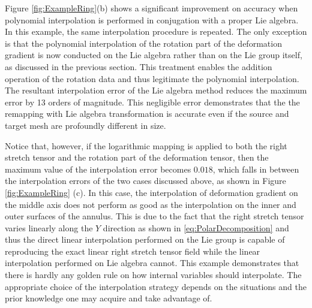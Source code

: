 \documentclass[12pt]{article}
\begin{document}
Figure \ref{fig:ExampleRing}(b) shows a significant improvement on
accuracy when polynomial interpolation is performed in conjugation
with a proper Lie algebra.  In this example, the same interpolation
procedure is repeated. The only exception is that the polynomial
interpolation of the rotation part of the deformation gradient is now
conducted on the Lie algebra rather than on the Lie group itself, as
discussed in the previous section.  This treatment enables the
addition operation of the rotation data and thus legitimate the
polynomial interpolation. The resultant interpolation error of the Lie
algebra method reduces the maximum error by 13 orders of
magnitude. This negligible error demonstrates that the the remapping
with Lie algebra transformation is accurate even if the source and
target mesh are profoundly different in size.

Notice that, however, if the logarithmic mapping is applied to both
the right stretch tensor and the rotation part of the deformation
tensor, then the maximum value of the interpolation error becomes
$0.018$, which falls in between the interpolation errors of the two
cases discussed above, as shown in Figure \ref{fig:ExampleRing}
(c). In this case, the interpolation of deformation gradient on the
middle axis does not perform as good as the interpolation on the inner
and outer surfaces of the annulus. This is due to the fact that the
right stretch tensor varies linearly along the $Y$ direction as shown
in \ref{eq:PolarDecomposition} and thus the direct linear
interpolation performed on the Lie group is capable of reproducing the
exact linear right stretch tensor field while the linear interpolation
performed on Lie algebra cannot. This example demonstrates that there
is hardly any golden rule on how internal variables should
interpolate. The appropriate choice of the interpolation strategy
depends on the situations and the prior knowledge one may acquire and
take advantage of.
\end{document}
